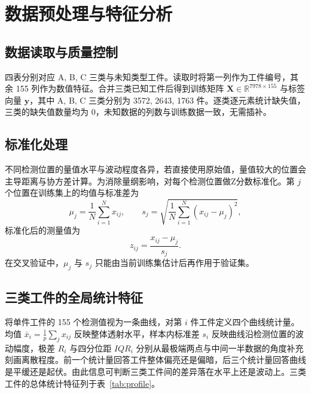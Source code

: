 \documentclass[12pt,a4paper]{article}
\begin{document}
\section{数据预处理与特征分析}
\subsection{数据读取与质量控制}

四表分别对应 A, B, C 三类与未知类型工件。读取时将第一列作为工件编号，其余 155 列作为数值特征。合并三类已知工件后得到训练矩阵 $\mathbf{X}\in\mathbb{R}^{7978\times155}$ 与标签向量 $\mathbf{y}$，其中 A, B, C 三类分别为 3572, 2643, 1763 件。逐类逐元素统计缺失值，三类的缺失值数量均为 0，未知数据的列数与训练数据一致，无需插补。

\subsection{标准化处理}

不同检测位置的量值水平与波动程度各异，若直接使用原始值，量值较大的位置会主导距离与协方差计算。为消除量纲影响，对每个检测位置做Z分数标准化。第 $j$ 个位置在训练集上的均值与标准差为
\begin{equation}
\mu_j=\frac{1}{N}\sum_{i=1}^{N}x_{ij},\qquad
s_j=\sqrt{\frac{1}{N}\sum_{i=1}^{N}(x_{ij}-\mu_j)^2},
\end{equation}
标准化后的测量值为
\begin{equation}
z_{ij}=\frac{x_{ij}-\mu_j}{s_j}.
\end{equation}
在交叉验证中，$\mu_j$ 与 $s_j$ 只能由当前训练集估计后再作用于验证集。

\subsection{三类工件的全局统计特征}

将单件工件的 155 个检测值视为一条曲线，对第 $i$ 件工件定义四个曲线统计量。均值 $\bar{x}_i=\frac{1}{p}\sum_j x_{ij}$ 反映整体透射水平，样本内标准差 $s_i$ 反映曲线沿检测位置的波动幅度，极差 $R_i$ 与四分位距 $IQR_i$ 分别从最极端两点与中间一半数据的角度补充刻画离散程度。前一个统计量回答工件整体偏亮还是偏暗，后三个统计量回答曲线是平缓还是起伏。由此信息可判断三类工件间的差异落在水平上还是波动上。三类工件的总体统计特征列于表~\ref{tab:profile}。

\begin{table}[H]
\centering
\caption{三类工件的全局统计特征}
\label{tab:profile}
\end{table}
\end{document}

